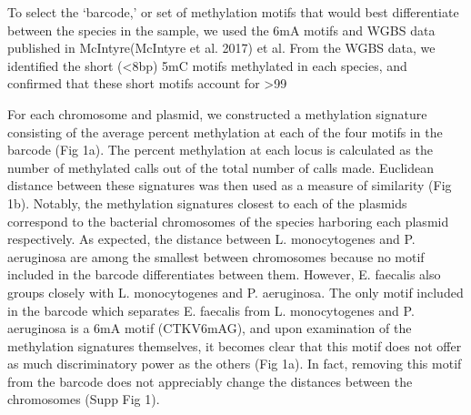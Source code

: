 To select the ‘barcode,’ or set of methylation motifs that would best differentiate between the species in the sample, we used the 6mA motifs and WGBS data published in McIntyre(McIntyre et al. 2017) et al. From the WGBS data, we identified the short (<8bp) 5mC motifs methylated in each species, and confirmed that these short motifs account for >99%

For each chromosome and plasmid, we constructed a methylation signature consisting of the average percent methylation at each of the four motifs in the barcode (Fig 1a). The percent methylation at each locus is calculated as the number of methylated calls out of the total number of calls made. Euclidean distance between these signatures was then used as a measure of similarity (Fig 1b). Notably, the methylation signatures closest to each of the plasmids correspond to the bacterial chromosomes of the species harboring each plasmid respectively. As expected, the distance between L. monocytogenes and P. aeruginosa are among the smallest between chromosomes because no motif included in the barcode differentiates between them. However, E. faecalis also groups closely with L. monocytogenes and P. aeruginosa. The only motif included in the barcode which separates E. faecalis from L. monocytogenes and P. aeruginosa is a 6mA motif (CTKV6mAG), and upon examination of the methylation signatures themselves, it becomes clear that this motif does not offer as much discriminatory power as the others (Fig 1a). In fact, removing this motif from the barcode does not appreciably change the distances between the chromosomes (Supp Fig 1).

